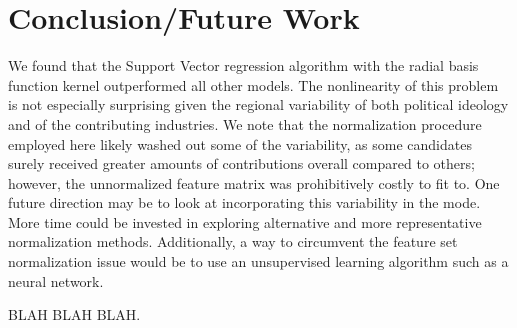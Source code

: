 \documentclass[12]{article}
\begin{document}
\section*{Conclusion/Future Work}

We found that the Support Vector regression algorithm with the radial basis function kernel outperformed all other models. The nonlinearity of this problem is not especially surprising given the regional variability of both political ideology and of the contributing industries. We note that the normalization procedure employed here likely washed out some of the variability, as some candidates surely received greater amounts of contributions overall compared to others; however, the unnormalized feature matrix was prohibitively costly to fit to. One future direction may be to look at incorporating this variability in the mode. More time could be invested in exploring alternative and more representative normalization methods. Additionally, a way to circumvent the feature set normalization issue would be to use an unsupervised learning algorithm such as a neural network.

\noindent BLAH BLAH BLAH. \\

\printbibliography
\end{document}
